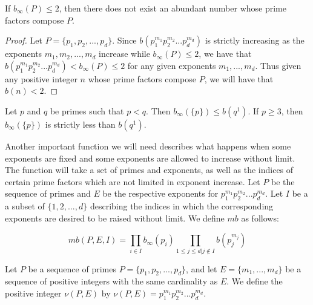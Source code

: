 \documentclass[../paper.tex]{article}
\begin{document}
\begin{theorem} \label{b_inf_n!}
If $b_{\infty}(P) \leq 2$, then there does not exist an abundant
number whose prime factors compose $P$.
\end{theorem}

\begin{proof}
Let $P = \{p_1, p_2, ..., p_d\}$.
Since $b(p_1^{m_1} p_2^{m_2} ... p_d^{m_d})$ is strictly increasing as the
exponents $m_1, m_2, ..., m_d$ increase while $b_{\infty}(P) \leq
2$, we have that $b(p_1^{m_1} p_2^{m_2} ... p_d^{m_d}) < 
b_{\infty}(P) \leq 2$ for any given exponents $m_1, ..., m_d$. 
Thus given any positive integer $n$ whose prime factors compose
$P$, we will have that $b(n) < 2$.
\end{proof}

\begin{theorem} \label{prime_ineq}
Let $p$ and $q$ be primes such that $p < q$. Then $b_\infty(\{p\})
\leq b(q^1)$. If $p \geq 3$, then $b_{\infty}(\{p\})$ is strictly
less than $b(q^1)$.
\end{theorem}

Another important function we will need describes what happens 
when some exponents are fixed and some exponents are allowed to
increase without limit. 
The function will take a set of primes and exponents,
as well as the indices of certain prime factors which are not
limited in exponent increase. Let $P$ be the sequence of primes 
and $E$ be the respective exponents for 
$p_1^{m_1} p_2^{m_2} ... p_d^{m_d}$. Let $I$ be a a subset of
$\{1, 2, ..., d\}$ describing the indices in which the corresponding
exponents are desired to be raised without limit. We define $mb$ as 
follows:

\begin{equation}\label{mb_def}
  mb(P,E,I) = \prod_{i \in I} b_{\infty}(p_i) 
  \prod_{1 \leq j \leq d | j \notin I} b(p_j^{m_j})
\end{equation}


Let $P$ be a sequence of primes $P = \{p_1, p_2, ..., p_d\}$,
and let $E = \{m_1, ..., m_d\}$ be a sequence of positive integers
with the same cardinality as $E$. We define the positive integer 
$\nu(P,E)$ by $\nu(P,E) = p_1^{m_1} p_2^{m_2} ... p_d^{m_d}$. 
\end{document}
